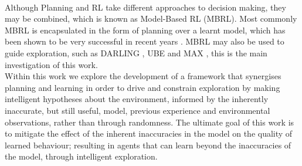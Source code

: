 \\Although Planning and RL take different approaches to decision making, they may be combined, which is known as Model-Based RL (MBRL). Most commonly MBRL is encapsulated in the form of planning over a learnt model, which has been shown to be very successful in recent years  \cite{silver2017mastering, pmlr-v28-levine13}. MBRL may also be used to guide exploration, such as DARLING \cite{AIJ16-leonetti}, UBE \cite{DBLP:journals/corr/abs-1709-05380} and MAX \cite{DBLP:journals/corr/abs-1810-12162}, this is the main investigation of this work.
\\Within this work we explore the development of a framework that synergises planning and learning in order to drive and constrain exploration by making intelligent hypotheses about the environment, informed by the inherently inaccurate, but still useful, model, previous experience and environmental observations, rather than through randomness. The ultimate goal of this work is to mitigate the effect of the inherent inaccuracies in the model on the quality of learned behaviour; resulting in agents that can learn beyond the inaccuracies of the model, through intelligent exploration.